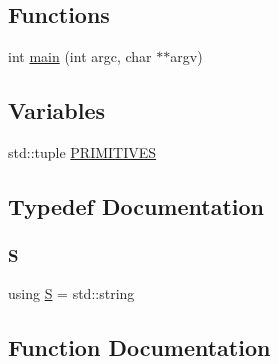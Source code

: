 \subsection*{Functions}
\begin{DoxyCompactItemize}
\item 
int \hyperlink{_models_2_formal_language_theory-_simple_2main_8cpp_a3c04138a5bfe5d72780bb7e82a18e627}{main} (int argc, char $\ast$$\ast$argv)
\end{DoxyCompactItemize}
\subsection*{Variables}
\begin{DoxyCompactItemize}
\item 
std\+::tuple \hyperlink{_models_2_formal_language_theory-_simple_2main_8cpp_a04e6d8e4b74d3f4fc965e5e5449158a3}{P\+R\+I\+M\+I\+T\+I\+V\+ES}
\end{DoxyCompactItemize}


\subsection{Typedef Documentation}
\mbox{\label{_models_2_formal_language_theory-_simple_2main_8cpp_a51c40915539205f0b5add30b0d68a4cb}} 
\subsubsection{\texorpdfstring{S}{S}}
{\footnotesize\ttfamily using \hyperlink{_models_2_formal_language_theory-_complex_2main_8cpp_a51c40915539205f0b5add30b0d68a4cb}{S} =  std\+::string}



\subsection{Function Documentation}
\mbox{\label{_models_2_formal_language_theory-_simple_2main_8cpp_a3c04138a5bfe5d72780bb7e82a18e627}} 
